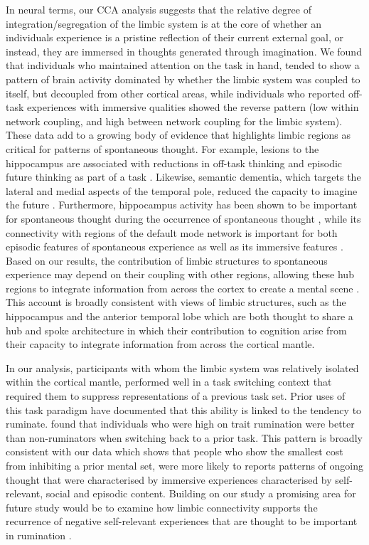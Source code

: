 In neural terms, our CCA analysis suggests that the relative degree of integration/segregation of the limbic system is at the core of whether an individuals experience is a pristine reflection of their current external goal, or instead, they are immersed in thoughts generated through imagination. We found that individuals who maintained attention on the task in hand, tended to show a pattern of brain activity dominated by whether the limbic system was coupled to itself, but decoupled from other cortical areas, while individuals who reported off-task experiences with immersive qualities showed the reverse pattern (low within network coupling, and high between network coupling for the limbic system). These data add to a growing body of evidence that highlights limbic regions as critical for patterns of spontaneous thought. For example, lesions to the hippocampus are associated with reductions in off-task thinking \cite{McCormick2018} and episodic future thinking as part of a task \cite{Maguire2011,Race2011}. Likewise, semantic dementia, which targets the lateral and medial aspects of the temporal pole, reduced the capacity to imagine the future \cite{Irish2012,Viard2014}. Furthermore, hippocampus activity has been shown to be important for spontaneous thought during the occurrence of spontaneous thought \cite{Ellamil2016}, while its connectivity with regions of the default mode network is important for both episodic features of spontaneous experience \cite{Karapanagiotidis2017} as well as its immersive features \cite{Smallwood2016}. Based on our results, the contribution of limbic structures to spontaneous experience may depend on their coupling with other regions, allowing these hub regions to integrate information from across the cortex to create a mental scene \cite{Hassabis2009}. This account is broadly consistent with views of limbic structures, such as the hippocampus \cite{Moscovitch2016} and the anterior temporal lobe \cite{Lambon-Ralph2017} which are both thought to share a hub and spoke architecture in which their contribution to cognition arise from their capacity to integrate information from across the cortical mantle.

In our analysis, participants with whom the limbic system was relatively isolated within the cortical mantle, performed well in a task switching context that required them to suppress representations of a previous task set. Prior uses of this task paradigm have documented that this ability is linked to the tendency to ruminate.  found that individuals who were high on trait rumination were better than non-ruminators when switching back to a prior task. This pattern is broadly consistent with our data which shows that people who show the smallest cost from inhibiting a prior mental set, were more likely to reports patterns of ongoing thought that were characterised by immersive experiences characterised by self-relevant, social and episodic content. Building on our study a promising area for future study would be to examine how limbic connectivity supports the recurrence of negative self-relevant experiences that are thought to be important in rumination \cite{Kleckner2017,Peters2016,Cooney2010}. 

